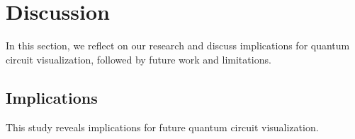 \section{Discussion}
\label{sec:discussion}
In this section, we reflect on our research and discuss implications for quantum circuit visualization, followed by future work and limitations.

\subsection{Implications}
\label{sec:implication}
This study reveals implications for future quantum circuit visualization.

